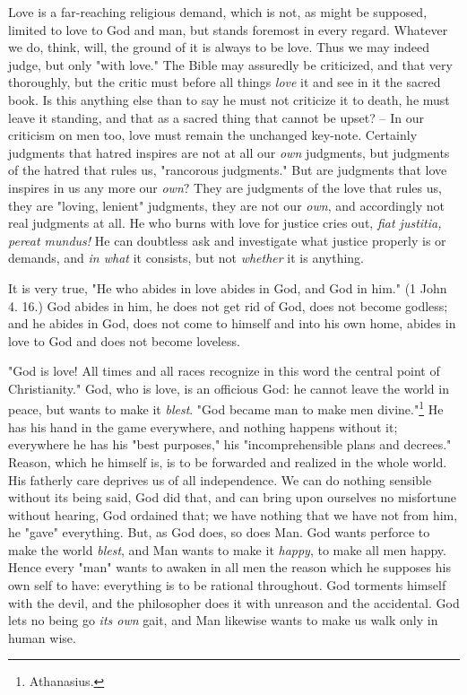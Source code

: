 Love is a far-reaching religious demand, which is not, as might be supposed, 
limited to love to God and man, but stands foremost in every regard. Whatever 
we do, think, will, the ground of it is always to be love. Thus we may indeed 
judge, but only "{}with love."{} The Bible may assuredly be criticized, and 
that very thoroughly, but the critic must before all things \textit{love} it 
and see in it the sacred book. Is this anything else than to say he must not 
criticize it to death, he must leave it standing, and that as a sacred thing 
that cannot be upset? -- In our criticism on men too, love must remain the 
unchanged key-note. Certainly judgments that hatred inspires are not at all 
our \textit{own} judgments, but judgments of the hatred that rules us, 
"{}rancorous judgments."{} But are judgments that love inspires in us any more 
our \textit{own}? They are judgments of the love that rules us, they are 
"{}loving, lenient"{} judgments, they are not our \textit{own}, and 
accordingly not real judgments at all. He who burns with love for justice 
cries out, \textit{fiat justitia, pereat mundus!} He can doubtless ask and 
investigate what justice properly is or demands, and \textit{in what} it 
consists, but not \textit{whether} it is anything.

It is very true, "{}He who abides in love abides in God, and God in him."{} (1 
John 4. 16.) God abides in him, he does not get rid of God, does not become 
godless; and he abides in God, does not come to himself and into his own home, 
abides in love to God and does not become loveless.

"{}God is love! All times and all races recognize in this word the central 
point of Christianity."{} God, who is love, is an officious God: he cannot 
leave the world in peace, but wants to make it \textit{blest}. "{}God became 
man to make men divine."{}\footnote{Athanasius.} He has his hand in the game 
everywhere, and nothing happens without it; everywhere he has his "{}best 
purposes,"{} his "{}incomprehensible plans and decrees."{} Reason, which he 
himself is, is to be forwarded and realized in the whole world. His fatherly 
care deprives us of all independence. We can do nothing sensible without its 
being said, God did that, and can bring upon ourselves no misfortune without 
hearing, God ordained that; we have nothing that we have not from him, he 
"{}gave"{} everything. But, as God does, so does Man. God wants perforce to 
make the world \textit{blest}, and Man wants to make it \textit{happy}, to 
make all men happy. Hence every "{}man"{} wants to awaken in all men the 
reason which he supposes his own self to have: everything is to be rational 
throughout. God torments himself with the devil, and the philosopher does it 
with unreason and the accidental. God lets no being go \textit{its own} gait, 
and Man likewise wants to make us walk only in human wise.

